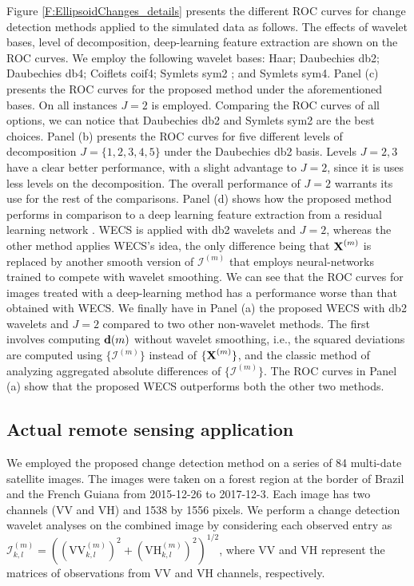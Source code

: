 \documentclass[journal]{IEEEtran}
\newcommand{\vd}{{\textbf d}}
\newcommand{\vX}{{\textbf X}}
\begin{document}
Figure \ref{F:EllipsoidChanges_details} presents the different ROC curves for change detection methods applied to the simulated data as follows. The effects of wavelet bases, level of decomposition, deep-learning feature extraction are shown on the ROC curves. We employ the following wavelet bases: Haar;  Daubechies db2; Daubechies db4; Coiflets coif4; Symlets sym2 ; and Symlets sym4. Panel (c) presents the ROC curves for the proposed method under the aforementioned bases. On all instances $J=2$ is employed. Comparing the ROC curves of all options, we can notice that Daubechies db2 and Symlets sym2 are the best choices.  Panel (b) presents the ROC curves for five different levels of decomposition $J=\{1,2,3,4,5\}$ under the Daubechies db2 basis. Levels $J=2,3$ have a clear better performance, with a slight advantage to $J=2$, since it is uses less levels on the decomposition. The overall performance  of $J=2$ warrants its use for the rest of the comparisons. Panel (d) shows how the proposed method performs in comparison to a deep learning feature extraction from a residual learning network \cite{zhang2017beyond}. WECS is applied with db2 wavelets and $J=2$, whereas the other method applies WECS's idea, the only difference being that $\vX^{(m)}$ is replaced by another smooth version of $\mathcal{I}^{(m)}$ that employs neural-networks trained to compete with wavelet smoothing. We can see that the ROC curves for images treated with a deep-learning method has a performance worse than that obtained with WECS. 
We finally have in Panel (a) the proposed WECS with db2 wavelets and $J=2$ compared to two other non-wavelet methods. The first involves computing $\vd(m)$ without wavelet smoothing, i.e., the squared deviations are computed using $\{\mathcal{I}^{(m)}\}$ instead of $\{\vX^{(m)}\}$, and the classic method of analyzing aggregated absolute differences of $\{\mathcal{I}^{(m)}\}$. The ROC curves in Panel (a) show that the proposed WECS outperforms both the other two methods. 



\subsection{Actual remote sensing application}\label{secExpActual}

We employed the proposed change detection method on a series of 84 multi-date satellite images. The images were taken on a forest region at the border of Brazil and the French Guiana from 2015-12-26 to 2017-12-3. Each image has two channels (VV and VH) and 1538 by 1556 pixels. We perform a change detection wavelet analyses on the combined image by considering each observed entry as $\mathcal{I}_{k,l}^{(m)} = ((\mathrm{VV}_{k,l}^{(m)})^2+(\mathrm{VH}_{k,l}^{(m)})^2)^{1/2}$, where $\mathrm{VV}$ and $\mathrm{VH}$ represent the matrices of observations from VV and VH channels, respectively. 
\end{document}
